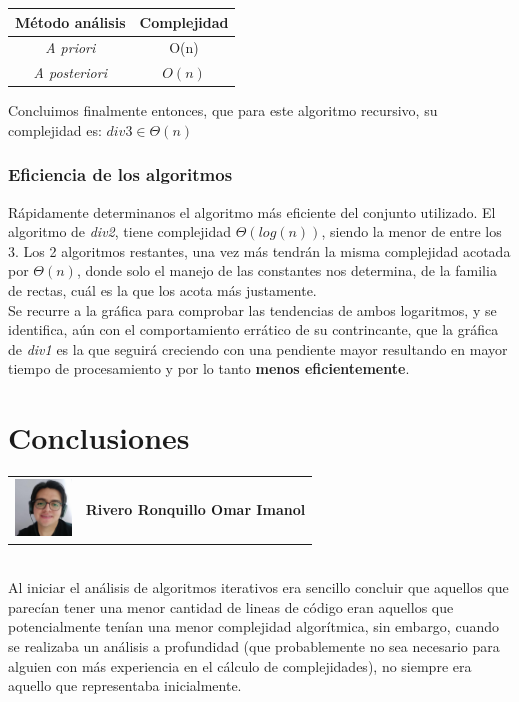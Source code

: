 \documentclass{report}
\begin{document}
                \begin{table}[h!]
                    \centering
                    \begin{tabular}{c | c}
                        Método análisis & Complejidad \\ \hline
                        \textit{A priori} & O(n)\\
                        \textit{A posteriori} & $O(n)$\\
                    \end{tabular}
                \end{table}
                
                Concluimos finalmente entonces, que para este algoritmo recursivo, su complejidad es: $div3 \in \Theta(n)$
                
        \subsubsection{Eficiencia de los algoritmos}
            Rápidamente determinanos el algoritmo más eficiente del conjunto utilizado. El algoritmo de \textit{div2}, tiene complejidad $\Theta(log(n))$, siendo la menor de entre los 3.
            Los 2 algoritmos restantes, una vez más tendrán la misma complejidad acotada por $\Theta(n)$, donde solo el manejo de las constantes nos determina, de la familia de rectas, cuál es la que los acota más justamente.\\
            Se recurre a la gráfica para comprobar las tendencias de ambos logaritmos, y se identifica, aún con el comportamiento errático de su contrincante, que la gráfica de \textit{div1} es la que seguirá creciendo con una pendiente mayor resultando en mayor tiempo de procesamiento y por lo tanto \textbf{menos eficientemente}.
\newpage
\section*{Conclusiones}
    \begin{tabular}{l l}
        \multirow{3}{*}{\includegraphics[width=1.5cm]{Imagenes/imanol.jpg}} &  \\
        & \textbf{Rivero Ronquillo Omar Imanol}\\
        & \\
    \end{tabular}
    \vspace*{3\baselineskip}\\
    Al iniciar el análisis de algoritmos iterativos era sencillo concluir que aquellos que parecían tener una menor cantidad de lineas de código eran aquellos que potencialmente tenían una menor complejidad algorítmica, sin embargo, cuando se realizaba un análisis a profundidad (que probablemente no sea necesario para alguien con más experiencia en el cálculo de complejidades), no siempre era aquello que representaba inicialmente.
    
\end{document}
